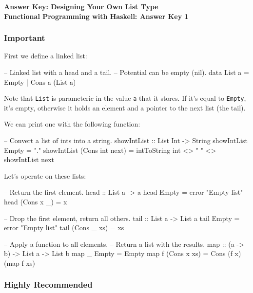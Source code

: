 \documentclass{article}
\begin{document}
\begin{center}
    \bf 
    {\Large Answer Key: Designing Your Own List Type} \\[1em]
    {\large Functional Programming with Haskell: Answer Key 1}
\end{center}

\subsubsection*{Important}
First we define a linked list:
\begin{haskellcode}
-- Linked list with a head and a tail.
-- Potential can be empty (nil).
data List a = Empty | Cons a (List a)
\end{haskellcode}
Note that \texttt{List} is parameteric in the value \texttt{a} that it stores. If it's equal to
\texttt{Empty}, it's empty, otherwise it holds an element and a pointer to the next list (the tail).

We can print one with the following function:
\begin{haskellcode}
-- Convert a list of ints into a string.
showIntList :: List Int -> String
showIntList Empty = "."
showIntList (Cons int next) = intToString int <> " " <> showIntList next
\end{haskellcode}

Let's operate on these lists:
\begin{haskellcode}
-- Return the first element.
head :: List a -> a
head Empty = error "Empty list"
head (Cons x _) = x

-- Drop the first element, return all others.
tail :: List a -> List a
tail Empty = error "Empty list"
tail (Cons _ xs) = xs

-- Apply a function to all elements.
-- Return a list with the results.
map :: (a -> b) -> List a -> List b
map _ Empty = Empty
map f (Cons x xs) = Cons (f x) (map f xs)
\end{haskellcode}

\newpage
\subsubsection*{Highly Recommended}
\end{document}
